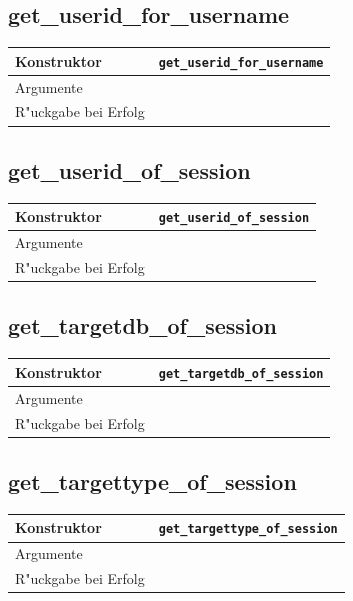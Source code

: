 \documentclass[11pt, twoside, a4paper, BCOR8mm, DIV12, bibtotoc,idxtotoc]{scrbook}
\begin{document}
\subsection{get\_userid\_for\_username}
\begin{shadowenv}
\begin{tabular}{lp{10cm}}
  Konstruktor & \texttt{get\_userid\_for\_username}\\
  \hline
  Argumente     & \\
  R"uckgabe bei Erfolg & \\
\end{tabular}
\end{shadowenv}

\subsection{get\_userid\_of\_session}
\begin{shadowenv}
\begin{tabular}{lp{10cm}}
  Konstruktor & \texttt{get\_userid\_of\_session}\\
  \hline
  Argumente     & \\
  R"uckgabe bei Erfolg & \\
\end{tabular}
\end{shadowenv}

\subsection{get\_targetdb\_of\_session}
\begin{shadowenv}
\begin{tabular}{lp{10cm}}
  Konstruktor & \texttt{get\_targetdb\_of\_session}\\
  \hline
  Argumente     & \\
  R"uckgabe bei Erfolg & \\
\end{tabular}
\end{shadowenv}

\subsection{get\_targettype\_of\_session}
\begin{shadowenv}
\begin{tabular}{lp{10cm}}
  Konstruktor & \texttt{get\_targettype\_of\_session}\\
  \hline
  Argumente     & \\
  R"uckgabe bei Erfolg & \\
\end{tabular}
\end{shadowenv}
\end{document}
